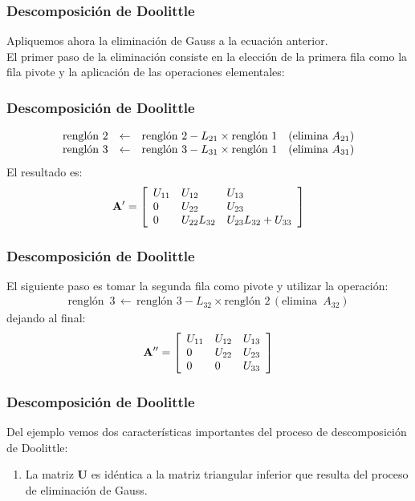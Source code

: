 \documentclass[12pt]{beamer}
\begin{document}
\begin{frame}[fragile]
\frametitle{Descomposición de Doolittle}
Apliquemos ahora la eliminación de Gauss a la ecuación anterior. 
\\
\bigskip
\pause
El primer paso de la eliminación  consiste en la elección de la primera fila como la fila pivote y la aplicación de las operaciones elementales:
\end{frame}
\begin{frame}[fragile]
\frametitle{Descomposición de Doolittle}
\fontsize{12}{12}\selectfont
\begin{align*}
\begin{array}{l l l l}
\text{renglón } 2 & \leftarrow & \text{renglón } 2 - L_{21} \times \text{renglón } 1 & (\text{elimina } A_{21}) \\
\text{renglón } 3 & \leftarrow & \text{renglón } 3 - L_{31} \times \text{renglón } 1 & (\text{elimina } A_{31})
\end{array}
\end{align*}
\pause 
\fontsize{14}{14}\selectfont
El resultado es:
\begin{align*}
\mathbf{A}^{\prime} =
\left[ \begin{array}{l l l}
U_{11} & U_{12} & U_{13} \\
0 & U_{22} & U_{23} \\
0 & U_{22}L_{32} & U_{23}L_{32}+U_{33}
\end{array} \right]
\end{align*}
\end{frame}
\begin{frame}
\frametitle{Descomposición de Doolittle}
El siguiente paso es tomar la segunda fila como pivote y utilizar la operación:
\pause
\fontsize{12}{12}\selectfont
\begin{align*}
\text{renglón } \, 3 \, \leftarrow \, \text{renglón } 3 - L_{32} \times \text{renglón } 2 \, (\text{elimina } \, A_{32})
\end{align*}
\pause
\fontsize{14}{14}\selectfont
dejando al final:
\pause
\renewcommand{\arraystretch}{1}
\begin{align*}
\mathbf{A}^{\prime \prime} = \left[
\begin{array}{l l l}
U_{11} & U_{12} & U_{13} \\
0 & U_{22} & U_{23} \\
0 & 0 & U_{33}
\end{array} \right]
\end{align*}
\end{frame}
\begin{frame}
\frametitle{Descomposición de Doolittle}
Del ejemplo vemos dos características importantes del proceso de descomposición de Doolittle:
\pause
{}
\begin{enumerate}
\item La matriz $\mathbf{U}$ es idéntica a la matriz triangular inferior que resulta del proceso de eliminación de Gauss.
\seti
\end{enumerate}
\end{frame}
\end{document}

